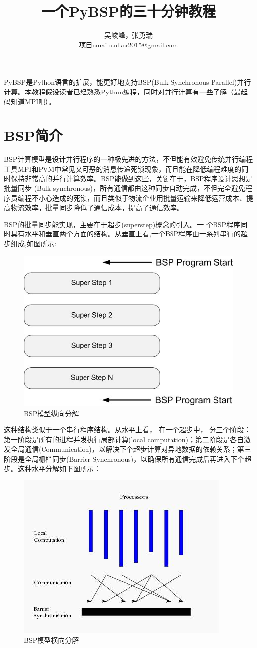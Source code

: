 \documentclass{article}
\title{一个PyBSP的三十分钟教程}
\author{吴峻峰，张勇瑞\\项目email:solker2015@gmail.com}
\begin{document}
\maketitle
PyBSP是Python语言的扩展，能更好地支持BSP(Bulk Synchronous Parallel)并行计算。本教程假设读者已经熟悉Python编程，同时对并行计算有一些了解（最起码知道MPI吧）。

\section{BSP简介}
BSP计算模型是设计并行程序的一种极先进的方法，不但能有效避免传统并行编程工具MPI和PVM中常见又可恶的消息传递死锁现象，而且能在降低编程难度的同时保持非常高的并行计算效率。BSP能做到这些，关键在于，BSP程序设计思想是批量同步 (Bulk synchronous)，所有通信都由这种同步自动完成，不但完全避免程序员编程不小心造成的死锁，而且类似于物流企业用批量运输来降低运营成本、提高物流效率，批量同步降低了通信成本，提高了通信效率。

BSP的批量同步能实现，主要在于超步(superstep)概念的引入。一 个BSP程序同时具有水平和垂直两个方面的结构。从垂直上看,一个BSP程序由一系列串行的超步组成,如图所示:
\begin{figure}[H]
\centering
\includegraphics[width=0.6 \textwidth]{hama-bsp.jpg}
\caption{BSP模型纵向分解}
\end{figure}
这种结构类似于一个串行程序结构。从水平上看， 在一个超步中， 分三个阶段：第一阶段是所有的进程并发执行局部计算(local computation)；第二阶段是各自激发全局通信(Communication)，以解决下个超步计算对异地数据的依赖关系；第三阶段是全局栅栏同步(Barrier Synchronous)，以确保所有通信完成后再进入下个超步。这种水平分解如下图所示：
\begin{figure}[H]
\centering
\includegraphics[width=0.6 \textwidth]{hama-bsp2.jpg}
\caption{BSP模型横向分解}
\end{figure}
\end{document}
